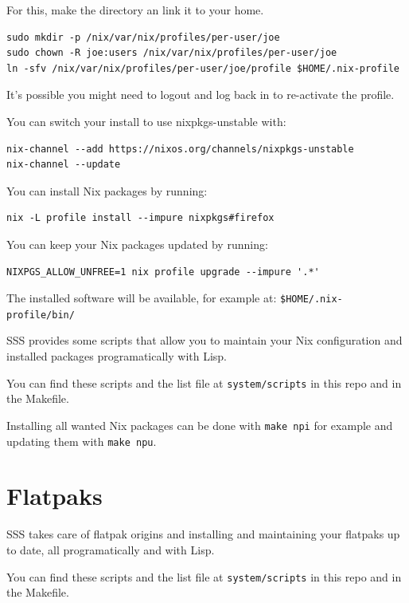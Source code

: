 \documentclass[11pt]{article}
\begin{document}
For this, make the directory an link it to your home.

\begin{verbatim}
sudo mkdir -p /nix/var/nix/profiles/per-user/joe
sudo chown -R joe:users /nix/var/nix/profiles/per-user/joe
ln -sfv /nix/var/nix/profiles/per-user/joe/profile $HOME/.nix-profile
\end{verbatim}

It's possible you might need to logout and log back in to re-activate the profile.

You can switch your install to use nixpkgs-unstable with:

\begin{verbatim}
nix-channel --add https://nixos.org/channels/nixpkgs-unstable
nix-channel --update
\end{verbatim}

You can install Nix packages by running:

\begin{verbatim}
nix -L profile install --impure nixpkgs#firefox
\end{verbatim}

You can keep your Nix packages updated by running:

\begin{verbatim}
NIXPGS_ALLOW_UNFREE=1 nix profile upgrade --impure '.*'
\end{verbatim}

The installed software will be available, for example at: \texttt{\$HOME/.nix-profile/bin/}

SSS provides some scripts that allow you to maintain your Nix configuration and installed packages programatically with Lisp.

You can find these scripts and the list file at \texttt{system/scripts} in this repo and in the Makefile.

Installing all wanted Nix packages can be done with \texttt{make npi} for example and updating them with \texttt{make npu}.

\section{Flatpaks}
\label{sec:org4197ddb}

SSS takes care of flatpak origins and installing and maintaining your flatpaks up to date, all programatically and with Lisp.

You can find these scripts and the list file at \texttt{system/scripts} in this repo and in the Makefile.
\end{document}
